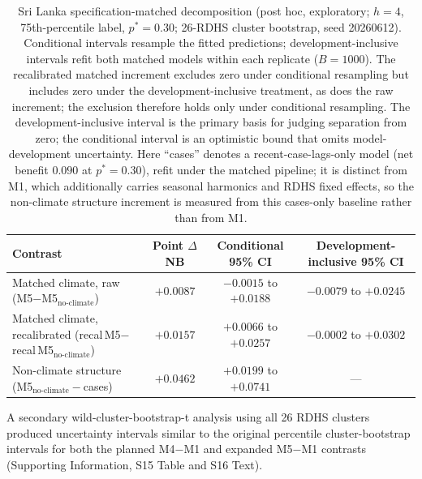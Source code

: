\documentclass[11pt,a4paper]{article}
\begin{document}
\begin{table}[htbp]
\centering
\caption{Sri Lanka specification-matched decomposition (post hoc, exploratory; $h=4$, 75th-percentile label, $p^*=0.30$; 26-RDHS cluster bootstrap, seed 20260612). Conditional intervals resample the fitted predictions; development-inclusive intervals refit both matched models within each replicate ($B=1000$). The recalibrated matched increment excludes zero under conditional resampling but includes zero under the development-inclusive treatment, as does the raw increment; the exclusion therefore holds only under conditional resampling. The development-inclusive interval is the primary basis for judging separation from zero; the conditional interval is an optimistic bound that omits model-development uncertainty. Here ``cases'' denotes a recent-case-lags-only model (net benefit $0.090$ at $p^*=0.30$), refit under the matched pipeline; it is distinct from M1, which additionally carries seasonal harmonics and RDHS fixed effects, so the non-climate structure increment is measured from this cases-only baseline rather than from M1.}
\label{tab:slmatched}
\footnotesize{}
\begin{tabular}{@{}lccc@{}}
\toprule
Contrast & Point $\Delta$NB & Conditional 95\% CI & Development-inclusive 95\% CI \\
\midrule
Matched climate, raw (M5$-$M5$_{\text{no-climate}}$) & $+0.0087$ & $-0.0015$ to $+0.0188$ & $-0.0079$ to $+0.0245$ \\
Matched climate, recalibrated (recal\,M5$-$recal\,M5$_{\text{no-climate}}$) & $+0.0157$ & $+0.0066$ to $+0.0257$ & $-0.0002$ to $+0.0302$ \\
Non-climate structure (M5$_{\text{no-climate}}-$cases) & $+0.0462$ & $+0.0199$ to $+0.0741$ & --- \\
\bottomrule
\end{tabular}
\end{table} A secondary wild-cluster-bootstrap-t analysis using all 26 RDHS clusters produced uncertainty intervals similar to the original percentile cluster-bootstrap intervals for both the planned M4$-$M1 and expanded M5$-$M1 contrasts (Supporting Information, S15 Table and S16 Text).
\end{document}
